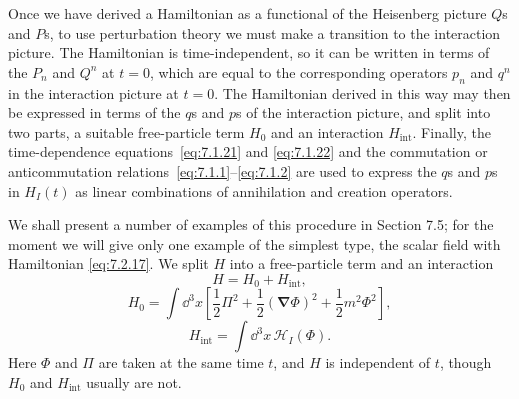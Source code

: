Once we have derived a Hamiltonian as a functional of the Heisenberg
picture $Q$s and $P$s, to use perturbation theory we must make a transition
to the interaction picture. The Hamiltonian is time-independent, so it can
be written in terms of the $P_n$ and $Q^n$ at $t=0$, which are equal to the
corresponding operators $p_n$ and $q^n$ in the interaction picture at $t=0$.
The Hamiltonian derived in this way may then be expressed in terms of the
$q$s and $p$s of the interaction picture, and split into two parts, a suitable
free-particle term $H_0$ and an interaction $H_{\mathrm{int}}$. Finally, the
time-dependence equations~\eqref{eq:7.1.21} and \eqref{eq:7.1.22} and the commutation or
anticommutation relations~\eqref{eq:7.1.1}--\eqref{eq:7.1.2} are used to express the $q$s and $p$s
in $H_I(t)$ as linear combinations of annihilation and creation operators.

We shall present a number of examples of this procedure in Section
7.5; for the moment we will give only one example of the simplest type,
the scalar field with Hamiltonian \eqref{eq:7.2.17}. We split $H$ into a free-particle
term and an interaction
\begin{equation}
H=H_0+H_{\mathrm{int}},
\tag{7.2.21}\label{eq:7.2.21}
\end{equation}
\begin{equation}
H_0=\int \dd^3x\left[\frac12\Pi^2+\frac12(\boldsymbol{\nabla}\Phi)^2
+\frac12m^2\Phi^2\right],
\tag{7.2.22}\label{eq:7.2.22}
\end{equation}
\begin{equation}
H_{\mathrm{int}}=\int \dd^3x\,\mathcal{H}_I(\Phi).
\tag{7.2.23}\label{eq:7.2.23}
\end{equation}
Here $\Phi$ and $\Pi$ are taken at the same time $t$, and $H$ is independent of
$t$, though $H_0$ and $H_{\mathrm{int}}$ usually are not.

